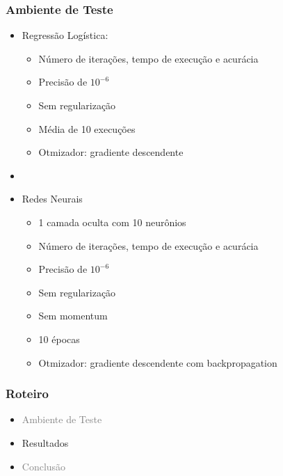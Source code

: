 \documentclass[10pt]{beamer}
\begin{document}
\begin{frame}[fragile]
  \frametitle{Ambiente de Teste}

  \begin{itemize}
    \item Regressão Logística:
    \begin{itemize}
      \item[-] Número de iterações, tempo de execução e acurácia
      \item[-] Precisão de $10^{-6}$
      \item[-] Sem regularização
      \item[-] Média de 10 execuções
      \item[-] Otmizador: gradiente descendente
    \end{itemize}

    \item[\ ] \ 
  \end{itemize}


  \begin{itemize}
    \item Redes Neurais
    \begin{itemize}
      \item[-] 1 camada oculta com 10 neurônios
      \item[-] Número de iterações, tempo de execução e acurácia
      \item[-] Precisão de $10^{-6}$
      \item[-] Sem regularização
      \item[-] Sem momentum
      \item[-] 10 épocas
      \item[-] Otmizador: gradiente descendente com backpropagation
    \end{itemize}
  \end{itemize}



\end{frame}


\begin{frame}
  \frametitle{Roteiro}

  \begin{itemize}

    \item[\color{gray}{$\bullet$}] \textcolor{gray}{Ambiente de Teste}

    \item Resultados

    \item[\color{gray}{$\bullet$}] \textcolor{gray}{Conclusão}

  \end{itemize}

\end{frame}
\end{document}
